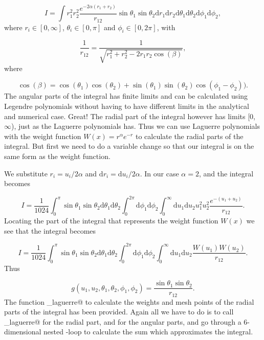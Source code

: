 \documentclass{article}
\begin{document}
\begin{multicols}{2}
\begin{equation}\label{eg:gaulag}
	I = \int    r_1^2 r_2^2 \frac{e^{- 2 \alpha (r_1 + r_2)}}{r_{12}} \sin \theta_1 \sin \theta_2 \mathrm{d}r_1  \mathrm{d}r_2 \mathrm{d}\theta_1 \mathrm{d}\theta_2 \mathrm{d}\phi_1\mathrm{d}\phi_2,
\end{equation}
where $r_i \in [0,\infty]$, $\theta_i \in [0,\pi]$ and $\phi_i \in [0, 2\pi]$, with

\begin{equation*}
	\frac{1}{r_{12}}= \frac{1}{\sqrt{r_1^2+r_2^2-2r_1r_2\cos(\beta)}},
\end{equation*}
where

\begin{equation*}
	\cos(\beta) = \cos(\theta_1)\cos(\theta_2)+\sin(\theta_1)\sin(\theta_2)\cos(\phi_1-\phi_2)).
\end{equation*}
The angular parts of the integral has finite limits and can be calculated using Legendre polynomials without having to have different limits in the analytical and numerical case. Great! The radial part of the integral however has limits [0,$\infty$), just as the Laguerre polynomials has. Thus we can use Laguerre polynomials with the weight function $W(x) = r^{\alpha} e^{-r}$ to calculate the radial parts of the integral. But first we need to do a variable change so that our integral is on the same form as the weight function. 

We substitute $r_i = u_i/2\alpha$ and $\mathrm{d}r_i = \mathrm{d}u_i/2\alpha$. In our case $\alpha = 2$, and the integral becomes

\begin{equation*}
	I = \frac{1}{1024} \int_0^{\pi} \sin \theta_1 \sin \theta_2 \mathrm{d}\theta_1 \mathrm{d}\theta_2 
	\int_0^{2\pi} \mathrm{d}\phi_1\mathrm{d}\phi_2
	\int_0^{\infty}   \mathrm{d}u_1  \mathrm{d}u_2 u_1^2 u_2^2 \frac{e^{- (u_1 + u_2)}}{r_{12}}.
\end{equation*}
Locating the part of the integral that represents the weight function $W(x)$ we see that the integral becomes

\begin{equation*}
	I = \frac{1}{1024} \int_0^{\pi} \sin \theta_1 \sin \theta_2 \mathrm{d}\theta_1 \mathrm{d}\theta_2 
	\int_0^{2\pi} \mathrm{d}\phi_1\mathrm{d}\phi_2
	\int_0^{\infty}   \mathrm{d}u_1  \mathrm{d}u_2 \frac{W(u_1) W(u_2)}{r_{12}}.
\end{equation*}
Thus 

\begin{equation*}
	g(u_1, u_2, \theta_1, \theta_2, \phi_1, \phi_2) = \frac{\sin \theta_1 \sin \theta_2}{r_{12}}.
\end{equation*}
The function \verb@gauss_laguerre@ to calculate the weights and mesh points of the radial parts of the integral has been provided. Again all we have to do is to call \verb@gauss_laguerre@ for the radial part, and \verb@gauleg@ for the angular parts, and go through a 6-dimensional nested \verb@for@-loop to calculate the sum which approximates the integral. 






\end{multicols}
\end{document}
